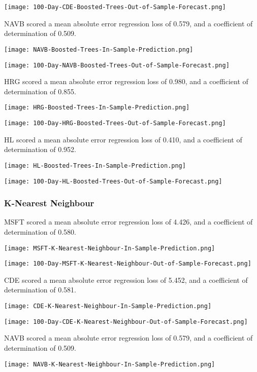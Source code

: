\texttt{[image: 100-Day-CDE-Boosted-Trees-Out-of-Sample-Forecast.png]}

NAVB scored a mean absolute error regression loss of 0.579, and a coefficient of determination of 0.509.

\texttt{[image: NAVB-Boosted-Trees-In-Sample-Prediction.png]}

\texttt{[image: 100-Day-NAVB-Boosted-Trees-Out-of-Sample-Forecast.png]}

HRG scored a mean absolute error regression loss of 0.980, and a coefficient of determination of 0.855.

\texttt{[image: HRG-Boosted-Trees-In-Sample-Prediction.png]}

\texttt{[image: 100-Day-HRG-Boosted-Trees-Out-of-Sample-Forecast.png]}

HL scored a mean absolute error regression loss of 0.410, and a coefficient of determination of 0.952.

\texttt{[image: HL-Boosted-Trees-In-Sample-Prediction.png]}

\texttt{[image: 100-Day-HL-Boosted-Trees-Out-of-Sample-Forecast.png]}

\subsubsection{K-Nearest Neighbour}
MSFT scored a mean absolute error regression loss of 4.426, and a coefficient of determination of 0.580.

\texttt{[image: MSFT-K-Nearest-Neighbour-In-Sample-Prediction.png]}

\texttt{[image: 100-Day-MSFT-K-Nearest-Neighbour-Out-of-Sample-Forecast.png]}

CDE scored a mean absolute error regression loss of 5.452, and a coefficient of determination of 0.581.

\texttt{[image: CDE-K-Nearest-Neighbour-In-Sample-Prediction.png]}

\texttt{[image: 100-Day-CDE-K-Nearest-Neighbour-Out-of-Sample-Forecast.png]}

NAVB scored a mean absolute error regression loss of 0.579, and a coefficient of determination of 0.509.

\texttt{[image: NAVB-K-Nearest-Neighbour-In-Sample-Prediction.png]}

